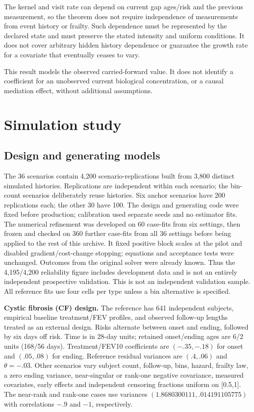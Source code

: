\documentclass[11pt]{article}
\begin{document}
The kernel and visit rate can depend on current gap ages/risk and the previous measurement, so the theorem does not require independence of measurements from event history or frailty. Such dependence must be represented by the declared state and must preserve the stated intensity and uniform conditions. It does not cover arbitrary hidden history dependence or guarantee the growth rate for a covariate that eventually ceases to vary.

This result models the observed carried-forward value. It does not identify a coefficient for an unobserved current biological concentration, or a causal mediation effect, without additional assumptions.

\section{Simulation study}\label{sec:6}

\subsection{Design and generating models}\label{sec:6.1}

The 36 scenarios contain 4,200 scenario-replications built from 3,800 distinct simulated histories. Replications are independent within each scenario; the bin-count scenarios deliberately reuse histories. Six anchor scenarios have 200 replications each; the other 30 have 100. The design and generating code were fixed before production; calibration used separate seeds and no estimator fits. The numerical refinement was developed on 60 case-fits from six settings, then frozen and checked on 360 further case-fits from all 36 settings before being applied to the rest of this archive. It fixed positive block scales at the pilot and disabled gradient/cost-change stopping; equations and acceptance tests were unchanged. Outcomes from the original solver were already known. Thus the 4,195/4,200 reliability figure includes development data and is not an entirely independent prospective validation. This is not an independent validation sample. All reference fits use four cells per type unless a bin alternative is specified.

\textbf{Cystic fibrosis (CF) design.} The reference has 641 independent subjects, empirical baseline treatment/FEV profiles, and observed follow-up lengths treated as an external design. Risks alternate between onset and ending, followed by six days off risk. Time is in 28-day units; retained onset/ending ages are 6/2 units (168/56 days). Treatment/FEV10 coefficients are \((-.35,-.18)\) for onset and \((.05,.08)\) for ending. Reference residual variances are \((.4,.06)\) and \(\theta=-.03\). Other scenarios vary subject count, follow-up, bins, hazard, frailty law, a zero ending variance, near-singular or rank-one negative covariance, measured covariates, early effects and independent censoring fractions uniform on [0.5,1]. The near-rank and rank-one cases use variances \((1.8680300111,.014191105775)\) with correlations \(-.9\) and \(-1\), respectively.
\end{document}

